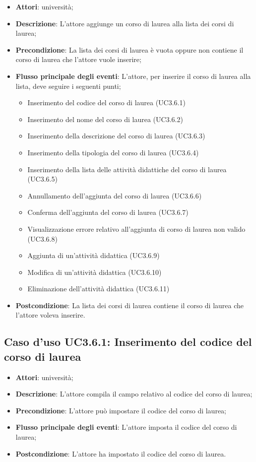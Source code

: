 \begin{itemize}
\item \textbf{Attori}: università;
\item \textbf{Descrizione}: L'attore aggiunge un corso di laurea alla lista dei corsi di laurea;
\item \textbf{Precondizione}: La lista dei corsi di laurea è vuota oppure non contiene il corso di laurea che l'attore vuole inserire;
\item \textbf{Flusso principale degli eventi}: L'attore, per inserire il corso di laurea alla lista, deve seguire i seguenti punti; 
\begin{itemize}
\item Inserimento del codice del corso di laurea (UC3.6.1)
\item Inserimento del nome del corso di laurea (UC3.6.2)
\item Inserimento della descrizione del corso di laurea (UC3.6.3)
\item Inserimento della tipologia del corso di laurea (UC3.6.4)
\item Inserimento della lista delle attività didattiche del corso di laurea (UC3.6.5)
\item Annullamento dell'aggiunta del corso di laurea (UC3.6.6)
\item Conferma dell’aggiunta del corso di laurea (UC3.6.7)
\item Visualizzazione errore relativo all’aggiunta di corso di laurea non valido  (UC3.6.8)
\item Aggiunta di un'attività didattica (UC3.6.9)
\item Modifica di un'attività didattica (UC3.6.10)
\item Eliminazione dell’attività didattica (UC3.6.11)
\end{itemize}
\item \textbf{Postcondizione}: La lista dei corsi di laurea contiene il corso di laurea che l'attore voleva inserire.
\end{itemize}
\subsection{Caso d'uso \texorpdfstring{UC3.6.1}{UC3.6.1}: Inserimento del codice del corso di laurea}
\begin{itemize}
\item \textbf{Attori}: università;
\item \textbf{Descrizione}: L'attore compila il campo relativo al codice del corso di laurea;
\item \textbf{Precondizione}: L'attore può impostare il codice del corso di laurea;
\item \textbf{Flusso principale degli eventi}: L'attore imposta il codice del corso di laurea;
\item \textbf{Postcondizione}: L'attore ha impostato il codice del corso di laurea.
\end{itemize}
